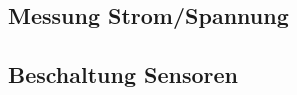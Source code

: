 \subsection{Messung Strom/Spannung}\label{subsec.MessungStromSpannung}

\subsection{Beschaltung Sensoren}\label{subsec.BeschaltungSensoren}



